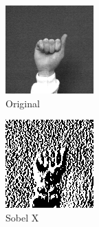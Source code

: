 \documentclass[conference]{IEEEtran}
\begin{document}
\begin{figure}[h]
\centering
\begin{subfigure}{.1\textwidth}
  \centering
  \includegraphics[width=.8\linewidth]{trieshorig}
  \caption{Original}
  \label{fig:sub1}
\end{subfigure}%
\begin{subfigure}{.1\textwidth}
  \centering
  \includegraphics[width=.8\linewidth]{trieshsobelx}
  \caption{Sobel X}
  \label{fig:sub2}
\end{subfigure}%
\begin{subfigure}{.1\textwidth}
  \centering

\end{subfigure}
\end{figure}
\end{document}
